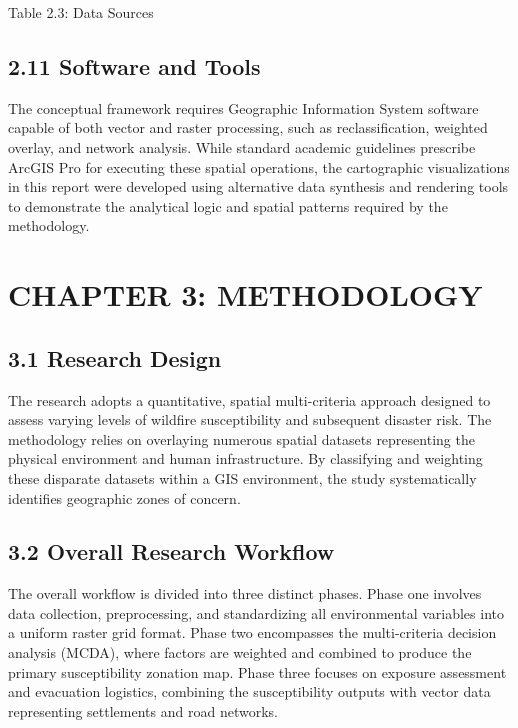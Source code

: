 \documentclass[12pt,a4paper]{article}
\begin{document}
Table 2.3: Data Sources



\subsection*{2.11 Software and Tools}

The conceptual framework requires Geographic Information System software capable of both vector and raster processing, such as reclassification, weighted overlay, and network analysis. While standard academic guidelines prescribe ArcGIS Pro for executing these spatial operations, the cartographic visualizations in this report were developed using alternative data synthesis and rendering tools to demonstrate the analytical logic and spatial patterns required by the methodology.



\clearpage
\section*{CHAPTER 3: METHODOLOGY}


\subsection*{3.1 Research Design}

The research adopts a quantitative, spatial multi-criteria approach designed to assess varying levels of wildfire susceptibility and subsequent disaster risk. The methodology relies on overlaying numerous spatial datasets representing the physical environment and human infrastructure. By classifying and weighting these disparate datasets within a GIS environment, the study systematically identifies geographic zones of concern.



\subsection*{3.2 Overall Research Workflow}

The overall workflow is divided into three distinct phases. Phase one involves data collection, preprocessing, and standardizing all environmental variables into a uniform raster grid format. Phase two encompasses the multi-criteria decision analysis (MCDA), where factors are weighted and combined to produce the primary susceptibility zonation map. Phase three focuses on exposure assessment and evacuation logistics, combining the susceptibility outputs with vector data representing settlements and road networks.
\end{document}
